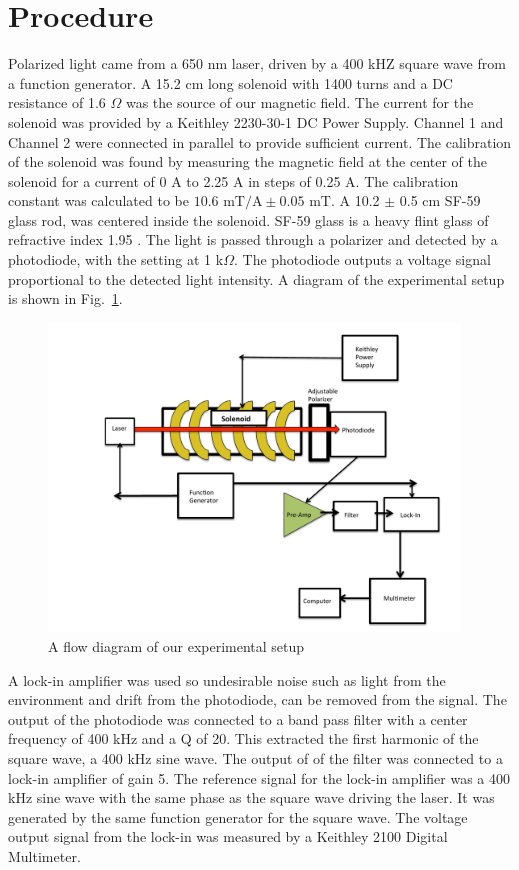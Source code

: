 \documentclass[prb,preprint]{revtex4-1}
\begin{document}
\section{Procedure}
{Polarized light came from a 650 nm laser, driven by a 400 kHZ square wave from a function generator. A 15.2 cm long solenoid with 1400 turns and a DC resistance of 1.6 $\Omega$ was the source of our magnetic field. The current for the solenoid was provided by a Keithley 2230-30-1 DC Power Supply. Channel 1 and Channel 2 were connected in parallel to provide sufficient current. The calibration of the solenoid was found by measuring the magnetic field at the center of the solenoid for a current of 0 A to 2.25 A in steps of 0.25 A. The calibration constant was calculated to be $10.6 \textrm{~mT/A} \pm 0.05 \text{~mT}$. A 10.2 $\pm$ 0.5 cm SF-59 glass rod, was centered inside the solenoid. SF-59 glass is a heavy flint glass of refractive index 1.95 \cite{optics}.  The light is passed through a polarizer and detected by a photodiode, with the setting at 1 k$\Omega$. The photodiode outputs a voltage signal proportional to the detected light intensity\cite{teachspin}. A diagram of the experimental setup is shown in Fig.~\ref{setup}.

\begin{figure}
\includegraphics[width = 4.3in]{ExperimentalSetup}
\caption{\label{setup}A flow diagram of our experimental setup}
\end{figure}

A lock-in amplifier was used so undesirable noise such as light from the environment and drift from the photodiode, can be removed from the signal. The output of the photodiode was connected to a band pass filter with a center frequency of 400 kHz and a Q of 20. This extracted the first harmonic of the square wave, a 400 kHz sine wave. The output of of the filter was connected to a lock-in amplifier of gain 5. The reference signal for the lock-in amplifier was a 400 kHz sine wave with the same phase as the square wave driving the laser. It was generated by the same function generator for the square wave. The voltage output signal from the lock-in was measured by a Keithley 2100 Digital Multimeter.

}
\end{document}
